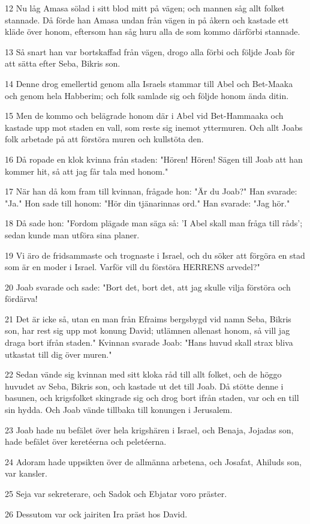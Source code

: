 \par 12 Nu låg Amasa sölad i sitt blod mitt på vägen; och mannen såg allt folket stannade. Då förde han Amasa undan från vägen in på åkern och kastade ett kläde över honom, eftersom han såg huru alla de som kommo därförbi stannade.
\par 13 Så snart han var bortskaffad från vägen, drogo alla förbi och följde Joab för att sätta efter Seba, Bikris son.
\par 14 Denne drog emellertid genom alla Israels stammar till Abel och Bet-Maaka och genom hela Habberim; och folk samlade sig och följde honom ända ditin.
\par 15 Men de kommo och belägrade honom där i Abel vid Bet-Hammaaka och kastade upp mot staden en vall, som reste sig inemot yttermuren. Och allt Joabs folk arbetade på att förstöra muren och kullstöta den.
\par 16 Då ropade en klok kvinna från staden: "Hören! Hören! Sägen till Joab att han kommer hit, så att jag får tala med honom."
\par 17 När han då kom fram till kvinnan, frågade hon: "Är du Joab?" Han svarade: "Ja." Hon sade till honom: "Hör din tjänarinnas ord." Han svarade: "Jag hör."
\par 18 Då sade hon: "Fordom plägade man säga så: 'I Abel skall man fråga till råds'; sedan kunde man utföra sina planer.
\par 19 Vi äro de fridsammaste och trognaste i Israel, och du söker att förgöra en stad som är en moder i Israel. Varför vill du förstöra HERRENS arvedel?"
\par 20 Joab svarade och sade: "Bort det, bort det, att jag skulle vilja förstöra och fördärva!
\par 21 Det är icke så, utan en man från Efraims bergsbygd vid namn Seba, Bikris son, har rest sig upp mot konung David; utlämnen allenast honom, så vill jag draga bort ifrån staden." Kvinnan svarade Joab: "Hans huvud skall strax bliva utkastat till dig över muren."
\par 22 Sedan vände sig kvinnan med sitt kloka råd till allt folket, och de höggo huvudet av Seba, Bikris son, och kastade ut det till Joab. Då stötte denne i basunen, och krigsfolket skingrade sig och drog bort ifrån staden, var och en till sin hydda. Och Joab vände tillbaka till konungen i Jerusalem.
\par 23 Joab hade nu befälet över hela krigshären i Israel, och Benaja, Jojadas son, hade befälet över keretéerna och peletéerna.
\par 24 Adoram hade uppsikten över de allmänna arbetena, och Josafat, Ahiluds son, var kansler.
\par 25 Seja var sekreterare, och Sadok och Ebjatar voro präster.
\par 26 Dessutom var ock jairiten Ira präst hos David.

